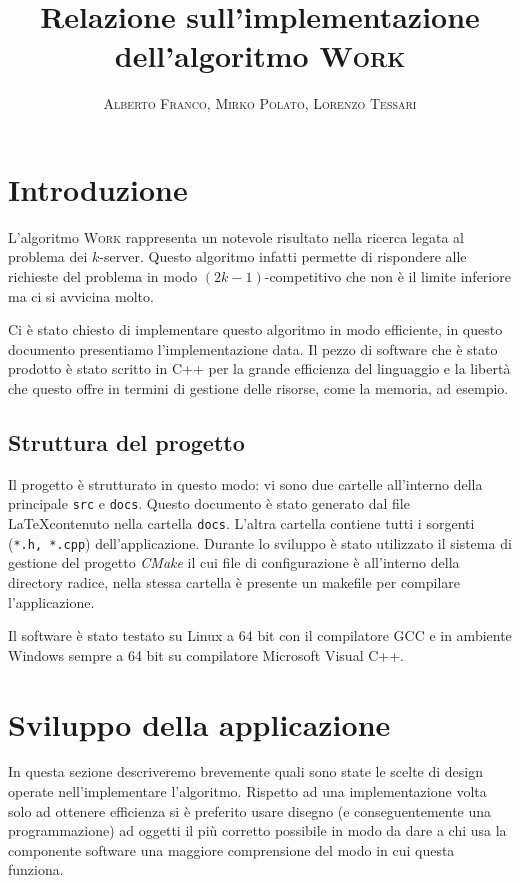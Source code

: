 \documentclass[a4paper, 10pt]{article}
\begin{document}
    \title{Relazione sull'implementazione dell'algoritmo \textsc{Work}}
    \author{\textsc{Alberto Franco, Mirko Polato, Lorenzo Tessari}}
    \maketitle

\section{Introduzione}    
L'algoritmo \textsc{Work} rappresenta un notevole risultato nella ricerca
legata al problema dei $k$-server. Questo algoritmo infatti permette di 
rispondere alle richieste del problema in modo $(2k - 1)$-competitivo che 
non è il limite inferiore ma ci si avvicina molto. 

Ci è stato chiesto di implementare questo algoritmo in modo efficiente, in 
questo documento presentiamo l'implementazione data. Il pezzo di software che 
è stato prodotto è stato scritto in C++ per la grande efficienza del 
linguaggio e la libertà che questo offre in termini di gestione delle risorse,
come la memoria, ad esempio.

\subsection{Struttura del progetto}
Il progetto è strutturato in questo modo: vi sono due cartelle all'interno della
principale \texttt{src} e \texttt{docs}. Questo documento è stato generato dal 
file \LaTeX contenuto nella cartella \texttt{docs}. L'altra cartella contiene 
tutti i sorgenti (\texttt{*.h, *.cpp}) dell'applicazione. Durante lo sviluppo
è stato utilizzato il sistema di gestione del progetto \emph{CMake} il cui
file di configurazione è all'interno della directory radice, nella stessa
cartella è presente un makefile per compilare l'applicazione. 

Il software è stato testato su Linux a 64 bit con il compilatore GCC e in 
ambiente Windows sempre a 64 bit su compilatore Microsoft Visual C++.

\section{Sviluppo della applicazione}
In questa sezione descriveremo brevemente quali sono state le scelte di design
operate nell'implementare l'algoritmo. Rispetto ad una implementazione volta
solo ad ottenere efficienza si è preferito usare disegno (e conseguentemente
una programmazione) ad oggetti il più corretto possibile in modo da dare 
a chi usa la componente software una maggiore comprensione del modo in cui questa
funziona. 
\end{document}
